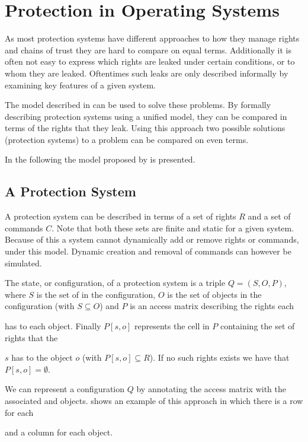 \section{Protection in Operating Systems}
As most protection systems have different approaches to how they manage rights and chains of trust they are hard to compare on equal terms.
Additionally it is often not easy to express which rights are leaked under certain conditions, or to whom they are leaked.
Oftentimes such leaks are only described informally by examining key features of a given system.

The model described in \citet{HRU} can be used to solve these problems.
By formally describing protection systems using a unified model, they can be compared in terms of the rights that they leak.
Using this approach two possible solutions (protection systems) to a problem can be compared on even terms.

In the following the model proposed by \citet{HRU} is presented.

\subsection{A Protection System}
A protection system can be described in terms of a set of rights $R$ and a set of commands $C$.
Note that both these sets are finite and static for a given system.
Because of this a system cannot dynamically add or remove rights or commands, under this model.
Dynamic creation and removal of commands can however be simulated.

\begin{definition}
The state, or configuration, of a protection system is a triple $Q = (S, O, P)$, where $S$ is the set of \subjects{} in the configuration, $O$ is the set of objects in the configuration (with $S \subseteq O$) and $P$ is an access matrix describing the rights each \subject{} has to each object.
Finally $P[s, o]$ represents the cell in $P$ containing the set of rights that the \subject{} $s$ has to the object $o$ (with $P[s, o] \subseteq R$).
If no such rights exists we have that $P[s,o] = \emptyset$.
\end{definition}

We can represent a configuration $Q$ by annotating the access matrix with the associated \subjects{} and objects.
 shows an example of this approach in which there is a row for each \subject{} and a column for each object.

